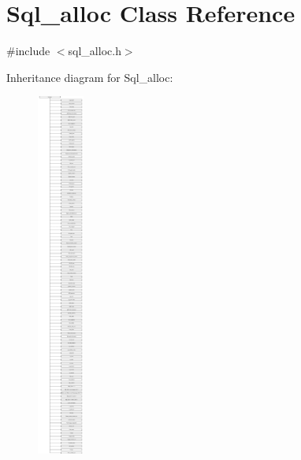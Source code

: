 \hypertarget{classSql__alloc}{}\section{Sql\+\_\+alloc Class Reference}
\label{classSql__alloc}


{\ttfamily \#include $<$sql\+\_\+alloc.\+h$>$}

Inheritance diagram for Sql\+\_\+alloc\+:\begin{figure}[H]
\begin{center}
\leavevmode
\includegraphics[height=12.000000cm]{classSql__alloc}
\end{center}
\end{figure}

